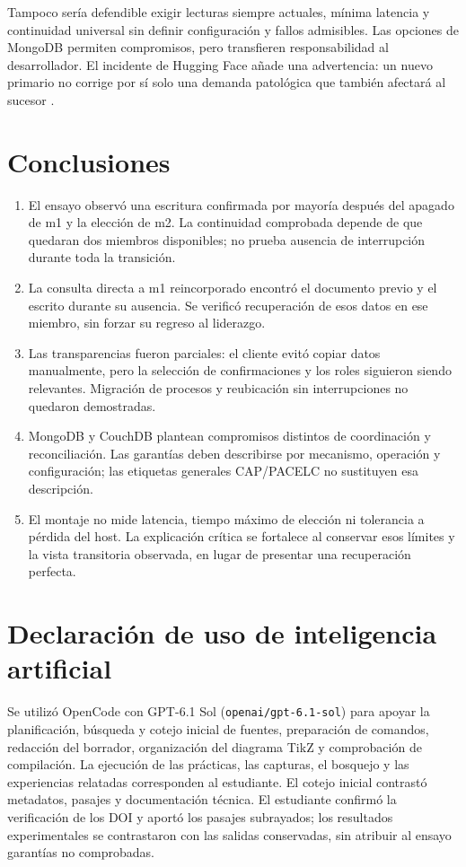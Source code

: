 Tampoco sería defendible exigir lecturas siempre actuales, mínima latencia y continuidad universal sin definir configuración y fallos admisibles. Las opciones de MongoDB permiten compromisos, pero transfieren responsabilidad al desarrollador. El incidente de Hugging Face añade una advertencia: un nuevo primario no corrige por sí solo una demanda patológica que también afectará al sucesor \cite{Georges2024}.

\section{Conclusiones}
\begin{enumerate}
\item El ensayo observó una escritura confirmada por mayoría después del apagado de m1 y la elección de m2. La continuidad comprobada depende de que quedaran dos miembros disponibles; no prueba ausencia de interrupción durante toda la transición.
\item La consulta directa a m1 reincorporado encontró el documento previo y el escrito durante su ausencia. Se verificó recuperación de esos datos en ese miembro, sin forzar su regreso al liderazgo.
\item Las transparencias fueron parciales: el cliente evitó copiar datos manualmente, pero la selección de confirmaciones y los roles siguieron siendo relevantes. Migración de procesos y reubicación sin interrupciones no quedaron demostradas.
\item MongoDB y CouchDB plantean compromisos distintos de coordinación y reconciliación. Las garantías deben describirse por mecanismo, operación y configuración; las etiquetas generales CAP/PACELC no sustituyen esa descripción.
\item El montaje no mide latencia, tiempo máximo de elección ni tolerancia a pérdida del host. La explicación crítica se fortalece al conservar esos límites y la vista transitoria observada, en lugar de presentar una recuperación perfecta.
\end{enumerate}

\section*{Declaración de uso de inteligencia artificial}
Se utilizó OpenCode con GPT-6.1 Sol (\texttt{openai/gpt-6.1-sol}) para apoyar la planificación, búsqueda y cotejo inicial de fuentes, preparación de comandos, redacción del borrador, organización del diagrama TikZ y comprobación de compilación. La ejecución de las prácticas, las capturas, el bosquejo y las experiencias relatadas corresponden al estudiante. El cotejo inicial contrastó metadatos, pasajes y documentación técnica. El estudiante confirmó la verificación de los DOI y aportó los pasajes subrayados; los resultados experimentales se contrastaron con las salidas conservadas, sin atribuir al ensayo garantías no comprobadas.
